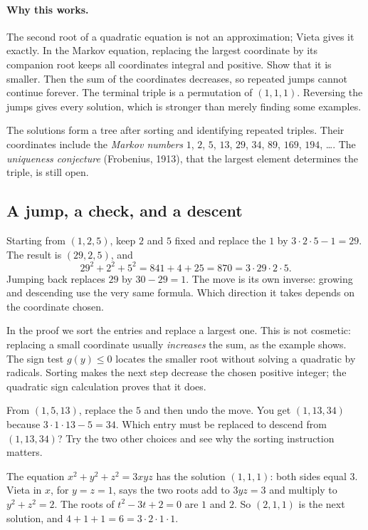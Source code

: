 \paragraph{Why this works.}
The second root of a quadratic equation is not an approximation; Vieta gives it exactly. In the Markov equation, replacing the largest coordinate by its companion root keeps all coordinates integral and positive. Show that it is smaller. Then the sum of the coordinates decreases, so repeated jumps cannot continue forever. The terminal triple is a permutation of $(1,1,1)$. Reversing the jumps gives every solution, which is stronger than merely finding some examples.

The solutions form a tree after sorting and identifying repeated triples. Their coordinates include the \emph{Markov numbers} $1$, $2$, $5$, $13$, $29$, $34$, $89$, $169$, $194$, \dots . The \emph{uniqueness conjecture} (Frobenius, 1913), that the largest element determines the triple, is still open.

\subsection*{A jump, a check, and a descent}
Starting from $(1,2,5)$, keep $2$ and $5$ fixed and replace the $1$ by $3\cdot2\cdot5-1=29$. The result is $(29,2,5)$, and
\[
29^2+2^2+5^2=841+4+25=870=3\cdot29\cdot2\cdot5.
\]
Jumping back replaces $29$ by $30-29=1$. The move is its own inverse: growing and descending use the very same formula. Which direction it takes depends on the coordinate chosen.

In the proof we sort the entries and replace a largest one. This is not cosmetic: replacing a small coordinate usually \emph{increases} the sum, as the example shows. The sign test $g(y)\le0$ locates the smaller root without solving a quadratic by radicals. Sorting makes the next step decrease the chosen positive integer; the quadratic sign calculation proves that it does.

\begin{think}
From $(1,5,13)$, replace the $5$ and then undo the move. You get $(1,13,34)$ because $3\cdot1\cdot13-5=34$. Which entry must be replaced to descend from $(1,13,34)$? Try the two other choices and see why the sorting instruction matters.
\end{think}

\begin{examplex}
The equation $x^2+y^2+z^2=3xyz$ has the solution $(1,1,1)$: both sides equal $3$.
Vieta in $x$, for $y=z=1$, says the two roots add to $3yz=3$ and multiply to $y^2+z^2=2$. The roots of $t^2-3t+2=0$ are $1$ and $2$. So $(2,1,1)$ is the next solution, and $4+1+1=6=3\cdot 2\cdot 1\cdot 1$.
\end{examplex}

